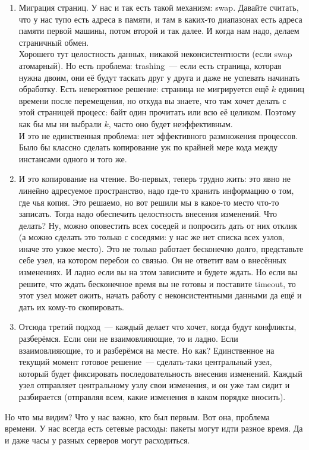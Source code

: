\documentclass{article}
\begin{document}
    \begin{enumerate}
        \item Миграция страниц. У нас и так есть такой механизм: swap. Давайте считать, что у нас тупо есть адреса в памяти, и там в каких-то диапазонах есть адреса памяти первой машины, потом второй и так далее. И когда нам надо, делаем страничный обмен.\\
        Хорошего тут целостность данных, никакой неконсистентности (если swap атомарный). Но есть проблема: trashing~--- если есть страница, которая нужна двоим, они её будут таскать друг у друга и даже не успевать начинать обработку. Есть невероятное решение: страница не мигрируется ещё $k$ единиц времени после перемещения, но откуда вы знаете, что там хочет делать с этой страницей процесс: байт один прочитать или всю её целиком. Поэтому как бы мы ни выбрали $k$, часто оно будет неэффективным.\\
        И это не единственная проблема: нет эффективного размножения процессов. Было бы классно сделать копирование уж по крайней мере кода между инстансами одного и того же.
        \item И это копирование на чтение. Во-первых, теперь трудно жить: это явно не линейно адресуемое пространство, надо где-то хранить информацию о том, где чья копия. Это решаемо, но вот решили мы в какое-то место что-то записать. Тогда надо обеспечить целостность внесения изменений. Что делать? Ну, можно оповестить всех соседей и попросить дать от них отклик (а можно сделать это только с соседями: у нас же нет списка всех узлов, иначе это узкое место). Это не только работает бесконечно долго, представьте себе узел, на котором перебои со связью. Он не ответит вам о внесённых изменениях. И ладно если вы на этом зависните и будете ждать. Но если вы решите, что ждать бесконечное время вы не готовы и поставите timeout, то этот узел может ожить, начать работу с неконсистентными данными да ещё и дать их кому-то скопировать.
        \item Отсюда третий подход~--- каждый делает что хочет, когда будут конфликты, разберёмся. Если они не взаимовлияющие, то и ладно. Если взаимовлияющие, то и разберёмся на месте. Но как? Единственное на текущий момент готовое решение~--- сделать-таки центральный узел, который будет фиксировать последовательность внесения изменений. Каждый узел отправляет центральному узлу свои изменения, и он уже там сидит и разбирается (отправляя всем, какие изменения в каком порядке вносить).
    \end{enumerate}
    Но что мы видим? Что у нас важно, кто был первым. Вот она, проблема времени. У нас всегда есть сетевые расходы: пакеты могут идти разное время. Да и даже часы у разных серверов могут расходиться.\\
\end{document}
